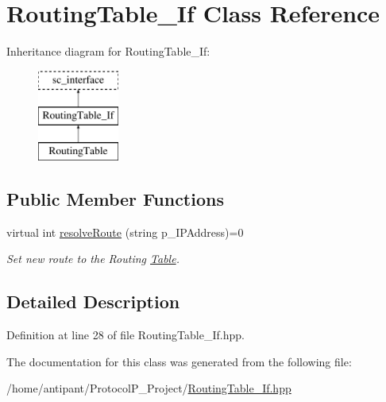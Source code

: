 \hypertarget{classRoutingTable__If}{\section{Routing\-Table\-\_\-\-If Class Reference}
\label{classRoutingTable__If}
}
Inheritance diagram for Routing\-Table\-\_\-\-If\-:\begin{figure}[H]
\begin{center}
\leavevmode
\includegraphics[height=3.000000cm]{classRoutingTable__If}
\end{center}
\end{figure}
\subsection*{Public Member Functions}
\begin{DoxyCompactItemize}
\item 
\hypertarget{classRoutingTable__If_af6210909231b656e415fa3c748db6e4f}{virtual int \hyperlink{classRoutingTable__If_af6210909231b656e415fa3c748db6e4f}{resolve\-Route} (string p\-\_\-\-I\-P\-Address)=0}\label{classRoutingTable__If_af6210909231b656e415fa3c748db6e4f}

\begin{DoxyCompactList}\small\item\em Set new route to the Routing \hyperlink{classTable}{Table}. \end{DoxyCompactList}\end{DoxyCompactItemize}


\subsection{Detailed Description}


Definition at line 28 of file Routing\-Table\-\_\-\-If.\-hpp.



The documentation for this class was generated from the following file\-:\begin{DoxyCompactItemize}
\item 
/home/antipant/\-Protocol\-P\-\_\-\-Project/\hyperlink{RoutingTable__If_8hpp}{Routing\-Table\-\_\-\-If.\-hpp}\end{DoxyCompactItemize}

